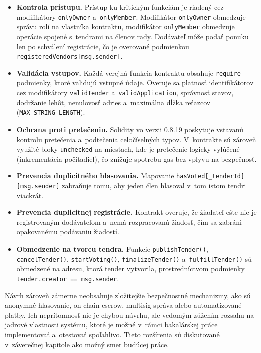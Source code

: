 \begin{itemize}
    \item \textbf{Kontrola prístupu.} Prístup ku kritickým funkciám je
    riadený cez modifikátory \texttt{onlyOwner} a~\texttt{onlyMember}.
    Modifikátor \texttt{onlyOwner} obmedzuje správu rolí na vlastníka
    kontraktu, modifikátor \texttt{onlyMember} obmedzuje operácie
    spojené s~tendrami na členov rady. Dodávateľ môže podať ponuku
    len po schválení registrácie, čo je overované podmienkou
    \texttt{registeredVendors[msg.sender]}.

    \item \textbf{Validácia vstupov.} Každá verejná funkcia kontraktu
    obsahuje \texttt{require} podmienky, ktoré validujú vstupné údaje.
    Overuje sa platnosť identifikátorov cez modifikátory
    \texttt{validTender} a~\texttt{validApplication}, správnosť stavov,
    dodržanie lehôt, nenulovosť adries a~maximálna dĺžka reťazcov
    (\texttt{MAX\_STRING\_LENGTH}).

    \item \textbf{Ochrana proti pretečeniu.} Solidity vo verzii 0.8.19
    poskytuje vstavanú kontrolu pretečenia a~podtečenia celočíselných
    typov. V~kontrakte sú zároveň využité bloky \texttt{unchecked} na
    miestach, kde je pretečenie logicky vylúčené (inkrementácia
    počítadiel), čo znižuje spotrebu gas bez vplyvu na bezpečnosť.

    \item \textbf{Prevencia duplicitného hlasovania.} Mapovanie
    \texttt{hasVoted[\_tenderId][msg.sender]} zabraňuje tomu, aby
    jeden člen hlasoval v~tom istom tendri viackrát.

    \item \textbf{Prevencia duplicitnej registrácie.} Kontrakt overuje,
    že žiadateľ ešte nie je registrovaným dodávateľom a~nemá
    rozpracovanú žiadosť, čím sa zabráni opakovanému podávaniu
    žiadostí.

    \item \textbf{Obmedzenie na tvorcu tendra.} Funkcie
    \texttt{publishTender()}, \texttt{cancelTender()},
    \texttt{startVoting()}, \texttt{finalizeTender()} a~\texttt{fulfillTender()}
    sú obmedzené na adresu, ktorá tender vytvorila, prostredníctvom
    podmienky \texttt{tender.creator == msg.sender}.
\end{itemize}

Návrh zároveň zámerne neobsahuje zložitejšie bezpečnostné mechanizmy,
ako sú anonymné hlasovanie, on-chain escrow, multisig správa alebo
automatizované platby. Ich neprítomnosť nie je chybou návrhu, ale vedomým
zúžením rozsahu na jadrové vlastnosti systému, ktoré je možné v~rámci
bakalárskej práce implementovať a~otestovať spoľahlivo. Tieto rozšírenia
sú diskutované v~záverečnej kapitole ako možný smer budúcej práce.

